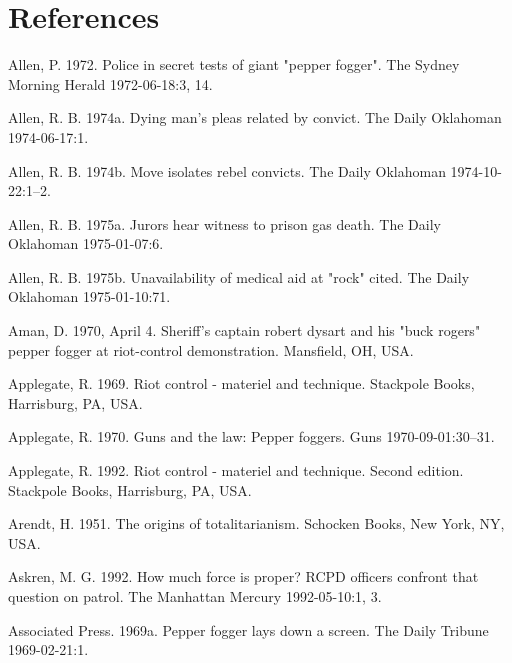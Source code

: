\documentclass[
  11pt,
]{krantz}
\newlength{\cslhangindent}
\newenvironment{CSLReferences}[2] %
 {%
  \setlength{\parindent}{0pt}
  \ifodd #1 \everypar{\setlength{\hangindent}{\cslhangindent}}\ignorespaces\fi
  \ifnum #2 > 0
  \setlength{\parskip}{#2\baselineskip}
  \fi
 }%
 {}
\begin{document}
\hypertarget{References}{%
\chapter*{References}\label{References}}


\hypertarget{refs}{}
\begin{CSLReferences}{1}{0}
\leavevmode{}%
Allen, P. 1972. Police in secret tests of giant "pepper fogger". The Sydney Morning Herald 1972-06-18:3, 14.

\leavevmode{}%
Allen, R. B. 1974a. Dying man's pleas related by convict. The Daily Oklahoman 1974-06-17:1.

\leavevmode{}%
Allen, R. B. 1974b. Move isolates rebel convicts. The Daily Oklahoman 1974-10-22:1--2.

\leavevmode{}%
Allen, R. B. 1975a. Jurors hear witness to prison gas death. The Daily Oklahoman 1975-01-07:6.

\leavevmode{}%
Allen, R. B. 1975b. Unavailability of medical aid at "rock" cited. The Daily Oklahoman 1975-01-10:71.

\leavevmode{}%
Aman, D. 1970, April 4. Sheriff's captain robert dysart and his "buck rogers" pepper fogger at riot-control demonstration. Mansfield, OH, USA.

\leavevmode{}%
Applegate, R. 1969. Riot control - materiel and technique. Stackpole Books, Harrisburg, PA, USA.

\leavevmode{}%
Applegate, R. 1970. Guns and the law: Pepper foggers. Guns 1970-09-01:30--31.

\leavevmode{}%
Applegate, R. 1992. Riot control - materiel and technique. Second edition. Stackpole Books, Harrisburg, PA, USA.

\leavevmode{}%
Arendt, H. 1951. The origins of totalitarianism. Schocken Books, New York, NY, USA.

\leavevmode{}%
Askren, M. G. 1992. How much force is proper? RCPD officers confront that question on patrol. The Manhattan Mercury 1992-05-10:1, 3.

\leavevmode{}%
Associated Press. 1969a. Pepper fogger lays down a screen. The Daily Tribune 1969-02-21:1.


\end{CSLReferences}
\end{document}
